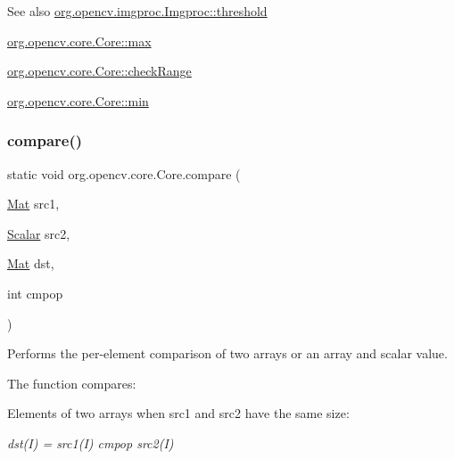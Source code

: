{\begin{DoxySeeAlso}{See also}
\mbox{\hyperlink{classorg_1_1opencv_1_1imgproc_1_1_imgproc_a428d1896f05ae5e0eadbe9a1489e6368}{org.\+opencv.\+imgproc.\+Imgproc\+::threshold}} 

\mbox{\hyperlink{classorg_1_1opencv_1_1core_1_1_core_aae8ad4feaca1ca8234bd88cbf9090cf5}{org.\+opencv.\+core.\+Core\+::max}} 

\mbox{\hyperlink{classorg_1_1opencv_1_1core_1_1_core_a2260f7346beb98771f860e39e4b4a924}{org.\+opencv.\+core.\+Core\+::check\+Range}} 

\mbox{\hyperlink{classorg_1_1opencv_1_1core_1_1_core_a24561bfde2c7fe7d2b7bee9d5ba8c92e}{org.\+opencv.\+core.\+Core\+::min}} 
\end{DoxySeeAlso}
}\mbox{\label{classorg_1_1opencv_1_1core_1_1_core_ab8d00dae0089e28d72949594e63ccc18}} 
\subsubsection{\texorpdfstring{compare()}{compare()}\hspace{0.1cm}{\footnotesize\ttfamily [2/2]}}
{\footnotesize\ttfamily static void org.\+opencv.\+core.\+Core.\+compare (\begin{DoxyParamCaption}\item[{\mbox{\hyperlink{classorg_1_1opencv_1_1core_1_1_mat}{Mat}}}]{src1,  }\item[{\mbox{\hyperlink{classorg_1_1opencv_1_1core_1_1_scalar}{Scalar}}}]{src2,  }\item[{\mbox{\hyperlink{classorg_1_1opencv_1_1core_1_1_mat}{Mat}}}]{dst,  }\item[{int}]{cmpop }\end{DoxyParamCaption})\hspace{0.3cm}{\ttfamily [static]}}

Performs the per-\/element comparison of two arrays or an array and scalar value.

The function compares\+:


\begin{DoxyItemize}
\item Elements of two arrays when {\ttfamily src1} and {\ttfamily src2} have the same size\+: 
\end{DoxyItemize}

{\itshape dst(\+I) = src1(\+I) cmpop src2(\+I)}


